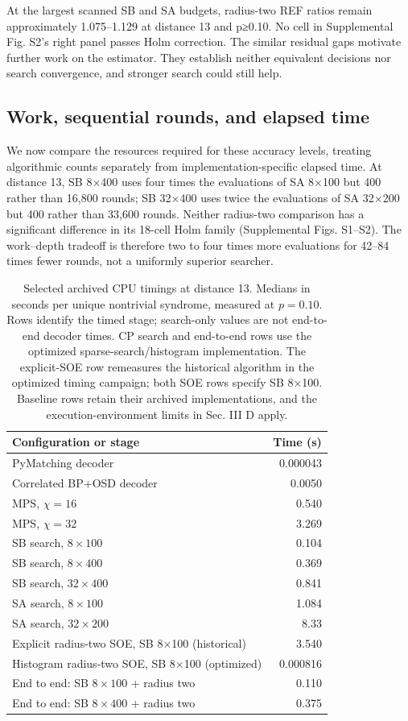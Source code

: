 \documentclass[aps,prapplied,reprint,superscriptaddress,amsmath,amssymb,floatfix,nofootinbib]{revtex4-2}
\begin{document}
At the largest scanned SB and SA budgets, radius-two REF ratios remain
approximately 1.075--1.129 at distance 13 and p≥0.10. No cell in
Supplemental Fig. S2's right panel passes Holm correction. The similar
residual gaps motivate further work on the estimator. They establish
neither equivalent decisions nor search convergence, and stronger search
could still help.

\subsection{Work, sequential rounds, and elapsed
time}\label{d.-work-sequential-rounds-and-elapsed-time}

We now compare the resources required for these accuracy levels,
treating algorithmic counts separately from implementation-specific
elapsed time. At distance 13, SB 8×400 uses four times the evaluations
of SA 8×100 but 400 rather than 16,800 rounds; SB 32×400 uses twice the
evaluations of SA 32×200 but 400 rather than 33,600 rounds. Neither
radius-two comparison has a significant difference in its 18-cell Holm
family (Supplemental Figs. S1--S2). The work--depth tradeoff is
therefore two to four times more evaluations for 42--84 times fewer
rounds, not a uniformly superior searcher.


\begin{table}[t]
\caption{Selected archived CPU timings at distance 13. Medians
in seconds per unique nontrivial syndrome, measured at \(p=0.10\). Rows
identify the timed stage; search-only values are not end-to-end decoder
times. CP search and end-to-end rows use the optimized
sparse-search/histogram implementation. The explicit-SOE row remeasures
the historical algorithm in the optimized timing campaign; both SOE rows
specify SB 8×100. Baseline rows retain their archived implementations,
and the execution-environment limits in Sec. III D apply.}\label{tab:2}
\centering\small
\begin{tabular}{@{}lr@{}}
\toprule
Configuration or stage & Time (s) \\
\midrule

PyMatching decoder & 0.000043 \\
Correlated BP+OSD decoder & 0.0050 \\
MPS, \(\chi=16\) & 0.540 \\
MPS, \(\chi=32\) & 3.269 \\
SB search, \(8\times100\) & 0.104 \\
SB search, \(8\times400\) & 0.369 \\
SB search, \(32\times400\) & 0.841 \\
SA search, \(8\times100\) & 1.084 \\
SA search, \(32\times200\) & 8.33 \\
Explicit radius-two SOE, SB 8×100 (historical) & 3.540 \\
Histogram radius-two SOE, SB 8×100 (optimized) & 0.000816 \\
End to end: SB \(8\times100\) + radius two & 0.110 \\
End to end: SB \(8\times400\) + radius two & 0.375 \\
\bottomrule\end{tabular}
\end{table}
\end{document}
